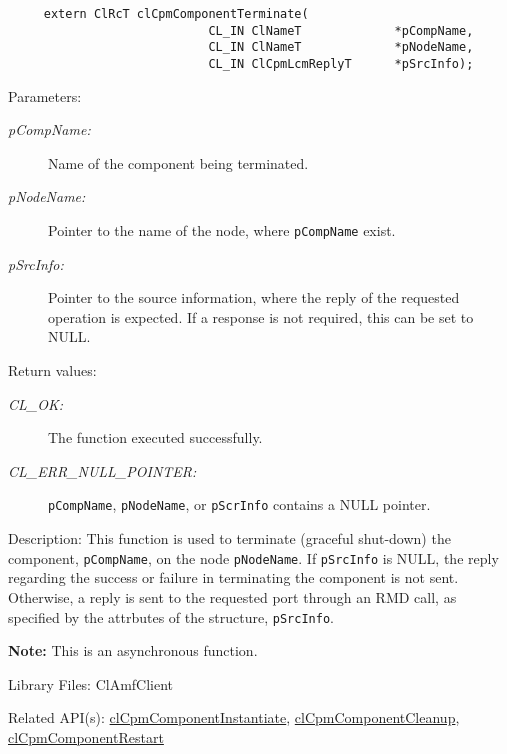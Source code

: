 {\begin{Desc}
\footnotesize\begin{verbatim}     extern ClRcT clCpmComponentTerminate(
                			CL_IN ClNameT             *pCompName,
                			CL_IN ClNameT             *pNodeName,
                			CL_IN ClCpmLcmReplyT      *pSrcInfo);
\end{verbatim}
\normalsize
\end{Desc}
\begin{Desc}
\item[Parameters:]
\begin{description}
\item[{\em p\-Comp\-Name:}]Name of the component being terminated.
\item[{\em p\-Node\-Name:}]Pointer to the name of the node, where {\tt{p\-Comp\-Name}} exist.
\item[{\em p\-Src\-Info:}]Pointer to the source information, where the reply of the requested operation is expected. If a response is not required, this
can be set to NULL.\end{description}
\end{Desc}
\begin{Desc}
\item[Return values:]
\begin{description}
\item[{\em CL\_\-OK:}]The function executed successfully. 
\item[{\em CL\_\-ERR\_\-NULL\_\-POINTER:}]{\tt{p\-Comp\-Name}}, {\tt{p\-Node\-Name}}, or {\tt{p\-Scr\-Info}} contains a NULL pointer.\end{description}
\end{Desc}
\begin{Desc}
\item[Description:]This function is used to terminate (graceful shut-down) the component, {\tt{p\-Comp\-Name}}, on the node {\tt{p\-Node\-Name}}. If 
{\tt{p\-Src\-Info}} is NULL, the reply regarding the success or failure in terminating the component is not sent. Otherwise, a reply is sent to the 
requested port through an RMD call, as specified by the attrbutes of the structure, {\tt{p\-Src\-Info}}.\end{Desc}
{\bf Note:} This is an asynchronous function.
\begin{Desc}
\item[Library Files:]Cl\-Amf\-Client\end{Desc}

\begin{Desc}
\item[Related API(s):]\hyperlink{group__group14}{cl\-Cpm\-Component\-Instantiate}, \hyperlink{group__group14}{cl\-Cpm\-Component\-Cleanup}, \hyperlink{group__group14}{cl\-Cpm\-Component\-Restart} \end{Desc}
\newpage




}
